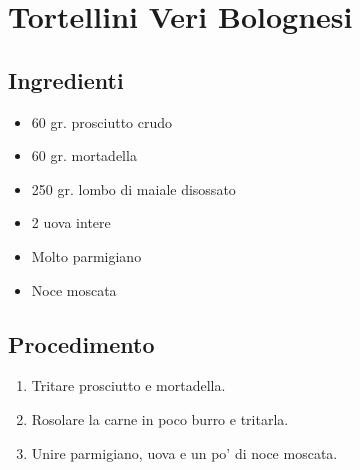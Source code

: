 \section{Tortellini Veri Bolognesi}
\subsection{Ingredienti}
\begin{itemize}
\item 60 gr. prosciutto crudo  
\item 60 gr. mortadella  
\item 250 gr. lombo di maiale disossato  
\item 2 uova intere  
\item Molto parmigiano  
\item Noce moscata
\end{itemize}
\subsection{Procedimento}
\begin{enumerate}
\item  Tritare prosciutto e mortadella.   
\item  Rosolare la carne in poco burro e tritarla.   
\item  Unire parmigiano, uova e un po' di noce moscata.
\end{enumerate}
